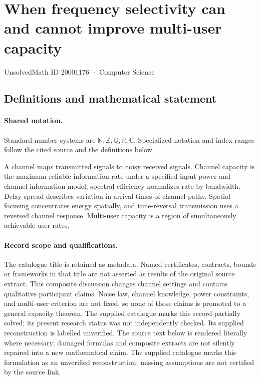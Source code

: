 \documentclass[11pt]{article}
\begin{document}
\setcounter{section}{20001175}
\section{When frequency selectivity can and cannot improve multi-user capacity}\label{20001176}
{\small\sffamily UnsolvedMath ID 20001176 · Computer Science}
\subsection{Definitions and mathematical statement}

\paragraph{Shared notation.}Standard number systems are $\mathbb N,\mathbb Z,\mathbb Q,\mathbb R,\mathbb C$. Specialized notation and index ranges follow the cited source and the definitions below.


A channel maps transmitted signals to noisy received signals. Channel capacity is the maximum reliable information rate under a specified input-power and channel-information model; spectral efficiency normalizes rate by bandwidth. Delay spread describes variation in arrival times of channel paths. Spatial focusing concentrates energy spatially, and time-reversal transmission uses a reversed channel response. Multi-user capacity is a region of simultaneously achievable user rates.
\paragraph{Record scope and qualifications.}
The catalogue title is retained as metadata. Named certificates, contracts, bounds or frameworks in that title are not asserted as results of the original source extract.
This composite discussion changes channel settings and contains qualitative participant claims. Noise law, channel knowledge, power constraints, and multi-user criterion are not fixed, so none of those claims is promoted to a general capacity theorem. The supplied catalogue marks this record partially solved; its present research status was not independently checked. Its supplied reconstruction is labelled unverified.
The source text below is rendered literally where necessary; damaged formulas and composite extracts are not silently repaired into a new mathematical claim.
The supplied catalogue marks this formulation as an unverified reconstruction; missing assumptions are not certified by the source link.
\end{document}
